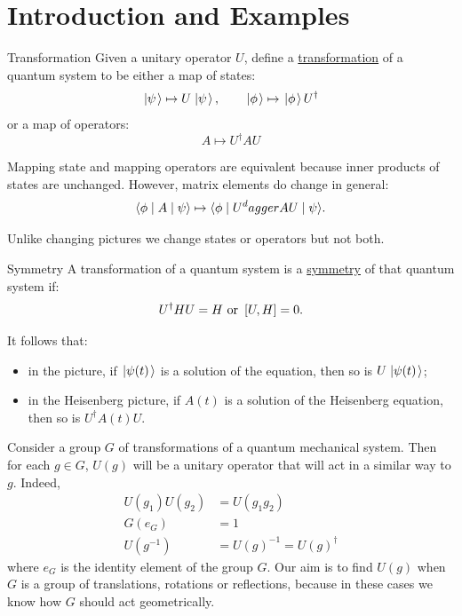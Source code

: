 \documentclass[../Main.tex]{subfiles}
\begin{document}
\section{Introduction and Examples}
\begin{definition}{Transformation}
    Given a unitary operator $U$, define a \underline{transformation} of a quantum system to be either a map of states:
    \begin{equation*}
        \left.\left|\psi\right.\right\rangle \mapsto U\left.\left|\psi\right.\right\rangle,\qquad \left.\left|\phi\right.\right\rangle \mapsto \left.\left|\phi\right.\right\rangle U^\dagger
    \end{equation*}
    or a map of operators:
    \begin{equation*}
        A \mapsto U^\dagger A U
    \end{equation*}
\end{definition}
\begin{remarks}
    \item Mapping state and mapping operators are equivalent because inner products of states are unchanged. However, matrix elements do change in general:
        \begin{equation*}
            \langle\phi\mid A\mid\psi\rangle \mapsto \langle\phi\mid U^dagger A U\mid\psi\rangle.
        \end{equation*}
    \item Unlike changing pictures we change states or operators but not both.
\end{remarks}
\begin{definition}{Symmetry}
    A transformation of a quantum system is a \underline{symmetry} of that quantum system if:
    \begin{equation*}
        U^\dagger H U = H \text{ or } \left[U, H\right] = 0.
    \end{equation*}
\end{definition}
It follows that:
\begin{itemize}
    \item in the \schr picture, if $\left.\left|\psi(t)\right.\right\rangle$ is a solution of the \schr equation, then so is $U\left.\left|\psi(t)\right.\right\rangle$;
    \item in the Heisenberg picture, if $A(t)$ is a solution of the Heisenberg equation, then so is $U^\dagger A(t) U$.
\end{itemize}
Consider a group $G$ of transformations of a quantum mechanical system. Then for each $g \in G$, $U(g)$ will be a unitary operator that will act in a similar way to $g$. Indeed,
\begin{align*}
    U(g_1) U(g_2) &= U(g_1 g_2) \\
    G(e_G) &= 1 \\
    U(g^{-1}) &= U(g)^{-1} = U(g)^\dagger
\end{align*}
where $e_G$ is the identity element of the group $G$. Our aim is to find $U(g)$ when $G$ is a group of translations, rotations or reflections, because in these cases we know how $G$ should act geometrically.
\end{document}

